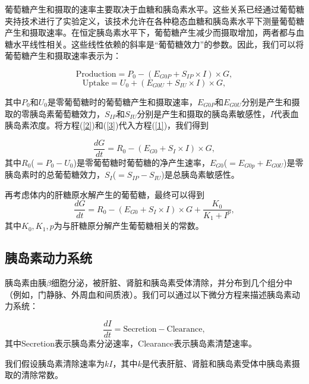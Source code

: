 葡萄糖产生和摄取的速率主要取决于血糖和胰岛素水平。这些关系已经通过葡萄糖夹持技术进行了实验定义，该技术允许在各种稳态血糖和胰岛素水平下测量葡萄糖产生和摄取速率\cite{bergman1985assessment}。在恒定胰岛素水平下，葡萄糖产生减少而摄取增加，两者都与血糖水平线性相关\cite{best1981glucose}。这些线性依赖的斜率是“葡萄糖效力”的参数。因此，我们可以将葡萄糖产生和摄取速率表示为：

\begin{equation}\label{2}
    \text{Production} = P_0 -(E_{G0P} + S_{IP} \times I) \times G,
\end{equation}
\begin{equation}\label{3}
    \text{Uptake} = U_0 + (E_{G0U} + S_{IU} \times I) \times G,
\end{equation}

其中$P_0$和$U_0$是零葡萄糖时的葡萄糖产生和摄取速率，\(E_{G0P}\)和\(E_{G0U}\)分别是产生和摄取的零胰岛素葡萄糖效力，\(S_{IP}\)和\(S_{IU}\)分别是产生和摄取的胰岛素敏感性，$I$代表血胰岛素浓度。将方程(\ref{2})和(\ref{3})代入方程(\ref{1})，我们得到

\begin{equation}
    \frac{dG}{dt} = R_0 -(E_{G0} + S_I \times I) \times G,
\end{equation}
其中$R_0$($=P_0-U_0$)是零葡萄糖时葡萄糖的净产生速率，\(E_{G0}\)($=E_{G0p}+E_{G0U}$)是零胰岛素时的总葡萄糖效力，\(S_I\)($=S_{IP}-S_{IU}$)是总胰岛素敏感性\cite{topp2000model}。

再考虑体内的肝糖原水解产生的葡萄糖，最终可以得到
\begin{equation}
    \frac{dG}{dt} = R_0 -(E_{G0} + S_I \times I) \times G+\frac{K_0}{K_1+I^p},
\end{equation}
其中$K_0,K_1,p$为与肝糖原分解产生葡萄糖相关的常数\cite{bridgewater2020amplitude}。
\subsection{胰岛素动力系统}
胰岛素由胰$\beta$细胞分泌，被肝脏、肾脏和胰岛素受体清除，并分布到几个组分中（例如，门静脉、外周血和间质液）。我们可以通过以下微分方程来描述胰岛素动力系统：

\begin{equation}\label{4}
\frac{dI}{dt} = \text{Secretion} - \text{Clearance},
\end{equation}
其中Secretion表示胰岛素分泌速率，Clearance表示胰岛素清楚速率。

我们假设胰岛素清除速率为\(kI\)，其中$k$是代表肝脏、肾脏和胰岛素受体中胰岛素摄取的清除常数。

